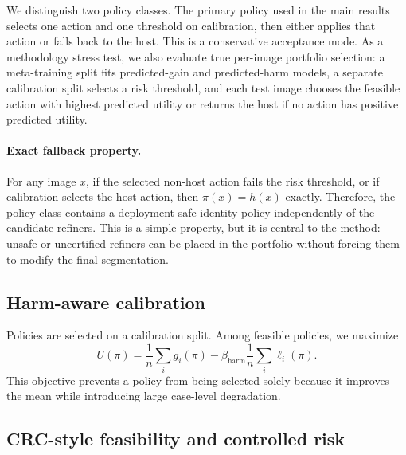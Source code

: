 \documentclass[preprint,12pt]{elsarticle}
\begin{document}
We distinguish two policy classes. The primary policy used in the main results
selects one action and one threshold on calibration, then either applies that
action or falls back to the host. This is a conservative acceptance mode. As a
methodology stress test, we also evaluate true per-image portfolio selection:
a meta-training split fits predicted-gain and predicted-harm models, a
separate calibration split selects a risk threshold, and each test image
chooses the feasible action with highest predicted utility or returns the host
if no action has positive predicted utility.

\paragraph{Exact fallback property.}
For any image $x$, if the selected non-host action fails the risk threshold, or
if calibration selects the host action, then $\pi(x)=h(x)$ exactly. Therefore,
the policy class contains a deployment-safe identity policy independently of
the candidate refiners. This is a simple property, but it is central to the
method: unsafe or uncertified refiners can be placed in the portfolio without
forcing them to modify the final segmentation.

\subsection{Harm-aware calibration}

Policies are selected on a calibration split. Among feasible policies, we
maximize
\begin{equation}
    U(\pi) = \frac{1}{n}\sum_i g_i(\pi) -
    \beta_{\mathrm{harm}}\frac{1}{n}\sum_i \ell_i(\pi).
\end{equation}
This objective prevents a policy from being selected solely because it improves
the mean while introducing large case-level degradation.

\subsection{CRC-style feasibility and controlled risk}
\end{document}
